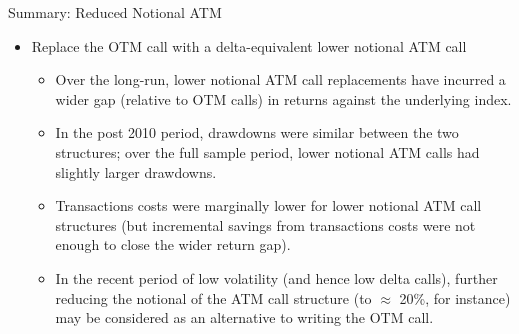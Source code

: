 \documentclass{beamer}
\begin{document}
\begin{frame}{Summary: Reduced Notional ATM}
\begin{itemize}
\item Replace the OTM call with a delta-equivalent lower notional ATM call
\begin{itemize}
\item Over the long-run, lower notional ATM call replacements have incurred a wider gap (relative to OTM calls) in returns against the underlying index. 
\vfill
\item In the post 2010 period, drawdowns were similar between the two structures; over the full sample period, lower notional ATM calls had slightly larger drawdowns.
\vfill
\item Transactions costs were marginally lower for lower notional ATM call structures (but incremental savings from transactions costs were not enough to close the wider return gap).
\vfill
\item In the recent period of low volatility (and hence low delta calls), further reducing the notional of the ATM call structure (to $ \approx$ 20\%, for instance) may be considered as an alternative to writing the OTM call. 
\end{itemize}
\end{itemize}
\end{frame}
\end{document}
